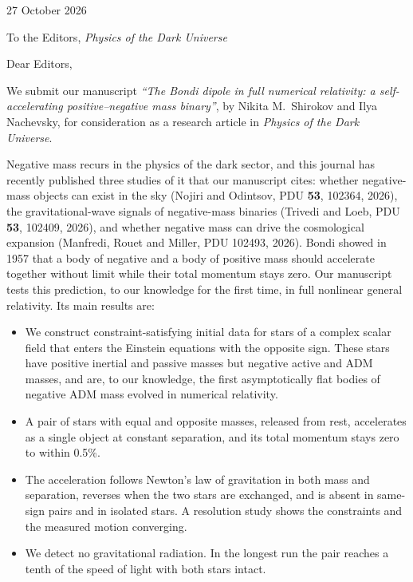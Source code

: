 \documentclass[11pt]{article}
\begin{document}
\begin{flushright}
27 October 2026
\end{flushright}

To the Editors, \emph{Physics of the Dark Universe}

Dear Editors,

We submit our manuscript \emph{``The Bondi dipole in full numerical relativity: a self-accelerating positive--negative mass binary''}, by Nikita M.\ Shirokov and Ilya Nachevsky, for consideration as a research article in \emph{Physics of the Dark Universe}.

Negative mass recurs in the physics of the dark sector, and this journal has recently published three studies of it that our manuscript cites: whether negative-mass objects can exist in the sky (Nojiri and Odintsov, PDU \textbf{53}, 102364, 2026), the gravitational-wave signals of negative-mass binaries (Trivedi and Loeb, PDU \textbf{53}, 102409, 2026), and whether negative mass can drive the cosmological expansion (Manfredi, Rouet and Miller, PDU 102493, 2026). Bondi showed in 1957 that a body of negative and a body of positive mass should accelerate together without limit while their total momentum stays zero. Our manuscript tests this prediction, to our knowledge for the first time, in full nonlinear general relativity. Its main results are:

\begin{itemize}\setlength{\itemsep}{0.2em}
\item We construct constraint-satisfying initial data for stars of a complex scalar field that enters the Einstein equations with the opposite sign. These stars have positive inertial and passive masses but negative active and ADM masses, and are, to our knowledge, the first asymptotically flat bodies of negative ADM mass evolved in numerical relativity.
\item A pair of stars with equal and opposite masses, released from rest, accelerates as a single object at constant separation, and its total momentum stays zero to within 0.5\%.
\item The acceleration follows Newton's law of gravitation in both mass and separation, reverses when the two stars are exchanged, and is absent in same-sign pairs and in isolated stars. A resolution study shows the constraints and the measured motion converging.
\item We detect no gravitational radiation. In the longest run the pair reaches a tenth of the speed of light with both stars intact.
\end{itemize}
\end{document}
